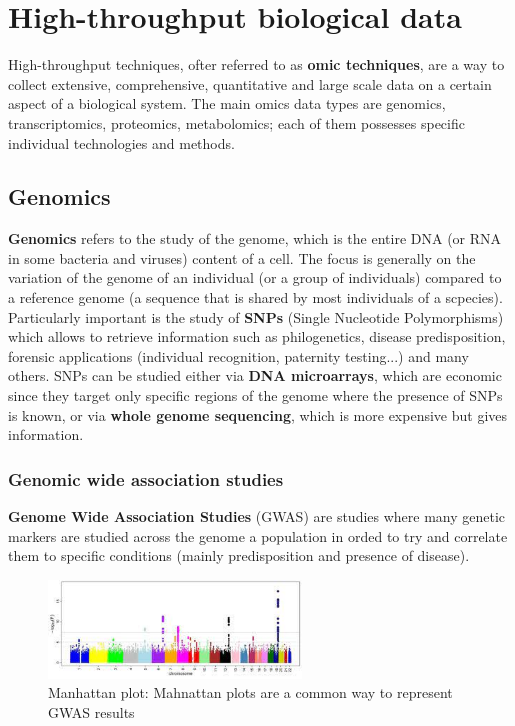 \graphicspath{{chapters/images/01/}}

\chapter{High-throughput biological data}
  High-throughput techniques, ofter referred to as \textbf{omic techniques}, are a way to collect extensive, comprehensive, quantitative and large scale data on a certain aspect of a biological system. The main omics data types are genomics, transcriptomics, proteomics, metabolomics; each of them possesses specific individual technologies and methods. 

  \section{Genomics}
    \textbf{Genomics} refers to the study of the genome, which is the entire DNA (or RNA in some bacteria and viruses) content of a cell. The focus is generally on the variation of the genome of an individual (or a group of individuals) compared to a reference genome (a sequence that is shared by most individuals of a scpecies). Particularly important is the study of \textbf{SNPs} (Single Nucleotide Polymorphisms) which allows to retrieve information such as philogenetics, disease predisposition, forensic applications (individual recognition, paternity testing...) and many others. SNPs can be studied either via \textbf{DNA microarrays}, which are economic since they target only specific regions of the genome where the presence of SNPs is known, or via \textbf{whole genome sequencing}, which is more expensive but gives information. 
    
    \subsection{Genomic wide association studies}
      \textbf{Genome Wide Association Studies} (GWAS) are studies where many genetic markers are studied across the genome a population in orded to try and correlate them to specific conditions (mainly predisposition and presence of disease).

      \begin{figure}[ht]
      \caption{Manhattan plot: Mahnattan plots are a common way to represent GWAS results}
      \centering
      \includegraphics[width=0.6\textwidth]{ManhattanPlot.jpg}
      \end{figure}


